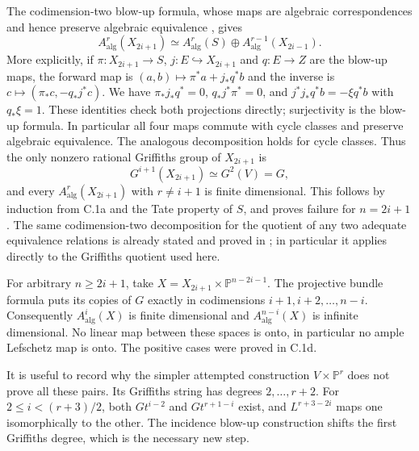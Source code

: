 The codimension-two blow-up formula, whose maps are algebraic
correspondences and hence preserve algebraic equivalence
\citep[Theorem 2.8(3)]{cyJiang2023}, gives
\begin{equation}\label{eq:iterated-griffiths-shift}
 A^r_{\mathrm{alg}}(X_{2i+1})
 \simeq A^r_{\mathrm{alg}}(S)
           \oplus A^{r-1}_{\mathrm{alg}}(X_{2i-1}).
\end{equation}
More explicitly, if $\pi:X_{2i+1}\to S$, $j:E\hookrightarrow
X_{2i+1}$ and $q:E\to Z$ are the blow-up maps, the forward map is
$(a,b)\mapsto\pi^*a+j_*q^*b$ and the inverse is
$c\mapsto(\pi_*c,-q_*j^*c)$. We have
$\pi_*j_*q^*=0$, $q_*j^*\pi^*=0$, and
$j^*j_*q^*b=-\xi q^*b$ with $q_*\xi=1$.
These identities check both projections directly; surjectivity is
the blow-up formula. In particular all four maps commute with
cycle classes and preserve algebraic equivalence.
The analogous decomposition holds for cycle classes. Thus the only
nonzero rational Griffiths group of $X_{2i+1}$ is
\[
 G^{i+1}(X_{2i+1})\simeq G^2(V)=G,
\]
and every $A^r_{\mathrm{alg}}(X_{2i+1})$ with $r\ne i+1$ is finite
dimensional. This follows by induction from C.1a and the Tate property
of $S$, and proves failure for $n=2i+1$.
The same codimension-two decomposition for the quotient of any
two adequate equivalence relations is already stated and proved
in \citet[Proposition 13, p.~482]{cySamuel1960}; in particular it
applies directly to the Griffiths quotient used here.

For arbitrary $n\ge2i+1$, take
$X=X_{2i+1}\times\mathbb P^{n-2i-1}$. The projective bundle formula
puts its copies of $G$ exactly in codimensions
$i+1,i+2,\ldots,n-i$. Consequently $A^i_{\mathrm{alg}}(X)$ is finite
dimensional and $A^{n-i}_{\mathrm{alg}}(X)$ is infinite dimensional.
No linear map between these spaces is onto, in particular no ample
Lefschetz map is onto. The positive cases were proved in C.1d.

It is useful to record why the simpler attempted construction
$V\times\mathbb P^r$ does not prove all these pairs. Its Griffiths
string has degrees $2,\ldots,r+2$. For $2\le i<(r+3)/2$, both
$Gt^{i-2}$ and $Gt^{r+1-i}$ exist, and $L^{r+3-2i}$ maps one
isomorphically to the other. The incidence blow-up construction
shifts the first Griffiths degree, which is the necessary new step.









